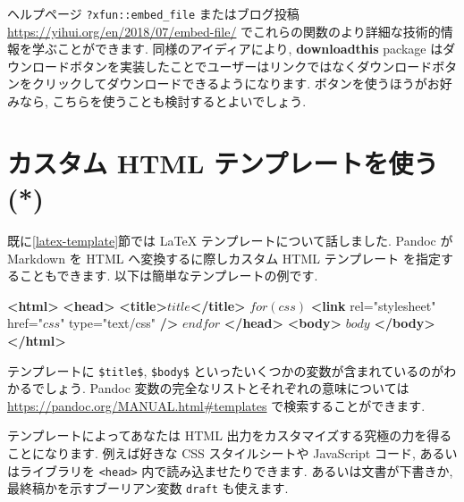 \documentclass[
  11pt,
]{bxjsreport}
\newenvironment{Shaded}{\begin{snugshade}}{\end{snugshade}}
\newcommand{\KeywordTok}[1]{\textcolor[rgb]{0.13,0.29,0.53}{\textbf{#1}}}
\newcommand{\NormalTok}[1]{#1}
\newcommand{\OtherTok}[1]{\textcolor[rgb]{0.56,0.35,0.01}{#1}}
\newcommand{\StringTok}[1]{\textcolor[rgb]{0.31,0.60,0.02}{#1}}
\begin{document}
ヘルプページ \texttt{?xfun::embed\_file} またはブログ投稿 \url{https://yihui.org/en/2018/07/embed-file/} でこれらの関数のより詳細な技術的情報を学ぶことができます. 同様のアイディアにより, \textbf{downloadthis} package \autocite{R-downloadthis} はダウンロードボタンを実装したことでユーザーはリンクではなくダウンロードボタンをクリックしてダウンロードできるようになります. ボタンを使うほうがお好みなら, こちらを使うことも検討するとよいでしょう.

\hypertarget{html-template}{%
\section{カスタム HTML テンプレートを使う (*)}\label{html-template}}

既に\ref{latex-template}節では LaTeX テンプレートについて話しました. Pandoc が Markdown を HTML へ変換するに際しカスタム HTML テンプレート を指定することもできます. 以下は簡単なテンプレートの例です.

\begin{Shaded}
\begin{Highlighting}[]
\KeywordTok{\textless{}html\textgreater{}}
  \KeywordTok{\textless{}head\textgreater{}}
    \KeywordTok{\textless{}title\textgreater{}}\NormalTok{$title$}\KeywordTok{\textless{}/title\textgreater{}}
\NormalTok{    $for(css)$}
    \KeywordTok{\textless{}link}\OtherTok{ rel=}\StringTok{"stylesheet"}\OtherTok{ href=}\StringTok{"$css$"}\OtherTok{ type=}\StringTok{"text/css"} \KeywordTok{/\textgreater{}}
\NormalTok{    $endfor$}
  \KeywordTok{\textless{}/head\textgreater{}}
  \KeywordTok{\textless{}body\textgreater{}}
\NormalTok{  $body$}
  \KeywordTok{\textless{}/body\textgreater{}}
\KeywordTok{\textless{}/html\textgreater{}}
\end{Highlighting}
\end{Shaded}

テンプレートに \texttt{\$title\$}, \texttt{\$body\$} といったいくつかの変数が含まれているのがわかるでしょう. Pandoc 変数の完全なリストとそれぞれの意味については \url{https://pandoc.org/MANUAL.html\#templates} で検索することができます.

テンプレートによってあなたは HTML 出力をカスタマイズする究極の力を得ることになります. 例えば好きな CSS スタイルシートや JavaScript コード, あるいはライブラリを \texttt{\textless{}head\textgreater{}} 内で読み込ませたりできます. あるいは文書が下書きか, 最終稿かを示すブーリアン変数 \texttt{draft} も使えます.
\end{document}

